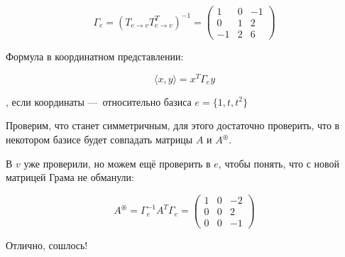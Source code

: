 \documentclass[12pt, a4paper]{article}
\begin{document}
    \begin{equation}
        \Gamma_e = (T_{e → v} T_{e → v}^T)^{-1} = \left(\begin{matrix}
            1 & 0 & -1 \\
            0 & 1 & 2 \\
            -1 & 2 & 6
        \end{matrix}\right)
    \end{equation}

    Формула в координатном представлении:

    \begin{equation}
        \langle x, y \rangle = x^T \Gamma_e y
    \end{equation}

    , если координаты — относительно базиса $e = \{ 1, t, t^2 \}$

    Проверим, что станет симметричным, для этого достаточно проверить, что в некотором базисе будет совпадать матрицы $A$ и $A^{\circledast}$.

    В $v$ уже проверили, но можем ещё проверить в $e$, чтобы понять, что с новой матрицей Грама не обманули:
    
    \begin{equation}
        A^{\circledast} = \Gamma_e^{-1} A^T \Gamma_e = \left(\begin{matrix}
            1 & 0 & -2 \\
            0 & 0 & 2 \\
            0 & 0 & -1
            \end{matrix}\right)
    \end{equation}

    Отлично, сошлось!

    
    
    
\end{document}
